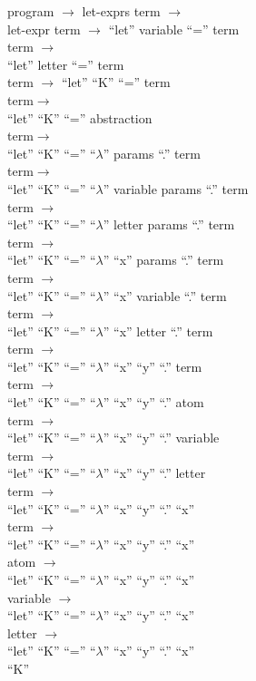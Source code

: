 \documentclass{article}
\begin{document}
\noindent program $\rightarrow$ let-exprs term $\rightarrow$\\
let-expr term $\rightarrow$ ``let'' variable ``='' term \\term $\rightarrow$\\
``let'' letter ``='' term \\term $\rightarrow$ ``let'' ``K'' ``='' term\\term$\rightarrow$\\
``let'' ``K'' ``='' abstraction \\term$\rightarrow$\\
``let'' ``K'' ``='' ``$\lambda$'' params ``.'' term \\term$\rightarrow$\\
``let'' ``K'' ``='' ``$\lambda$'' variable params  ``.'' term \\term $\rightarrow$\\
``let'' ``K'' ``='' ``$\lambda$'' letter params  ``.'' term \\term $\rightarrow$\\
``let'' ``K'' ``='' ``$\lambda$'' ``x'' params  ``.'' term \\term $\rightarrow$\\
``let'' ``K'' ``='' ``$\lambda$'' ``x'' variable  ``.'' term \\term $\rightarrow$\\
``let'' ``K'' ``='' ``$\lambda$'' ``x'' letter  ``.'' term \\term $\rightarrow$\\
``let'' ``K'' ``='' ``$\lambda$'' ``x'' ``y''  ``.'' term \\term $\rightarrow$\\
``let'' ``K'' ``='' ``$\lambda$'' ``x'' ``y''  ``.'' atom \\term $\rightarrow$\\
``let'' ``K'' ``='' ``$\lambda$'' ``x'' ``y''  ``.'' variable \\term $\rightarrow$\\
``let'' ``K'' ``='' ``$\lambda$'' ``x'' ``y''  ``.'' letter \\term $\rightarrow$\\
``let'' ``K'' ``='' ``$\lambda$'' ``x'' ``y''  ``.'' ``x'' \\term $\rightarrow$\\
``let'' ``K'' ``='' ``$\lambda$'' ``x'' ``y''  ``.'' ``x'' \\atom $\rightarrow$\\
``let'' ``K'' ``='' ``$\lambda$'' ``x'' ``y''  ``.'' ``x'' \\variable $\rightarrow$\\
``let'' ``K'' ``='' ``$\lambda$'' ``x'' ``y''  ``.'' ``x'' \\letter $\rightarrow$\\
``let'' ``K'' ``='' ``$\lambda$'' ``x'' ``y''  ``.'' ``x'' \\``K''\\
\end{document}
